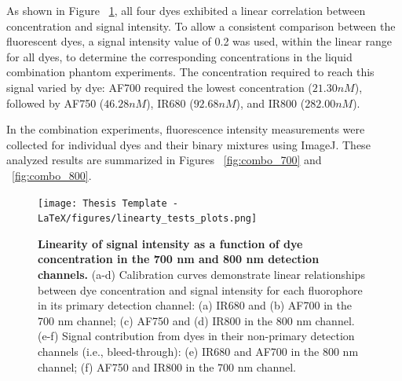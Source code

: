 As shown in Figure ~\ref{fig:linearity_test_plots}, all four dyes exhibited a linear correlation between concentration and signal intensity. To allow a consistent comparison between the fluorescent dyes, a signal intensity value of 0.2 was used, within the linear range for all dyes, to determine the
corresponding concentrations in the liquid combination phantom experiments. The concentration required to reach this signal varied by dye: AF700 required the lowest concentration ($21.30 nM$), followed by AF750 ($46.28 nM$), IR680 ($92.68 nM$), and IR800 ($282.00 nM$).

In the combination experiments, fluorescence intensity measurements were collected for individual dyes and their binary mixtures using ImageJ. These analyzed results are summarized in Figures ~\ref{fig:combo_700} and ~\ref{fig:combo_800}.

\begin{figure}[H]
    \centering
    \begin{minipage}{.94\linewidth}
        \texttt{[image: Thesis Template - LaTeX/figures/linearty\_tests\_plots.png]}
        \begin{minipage}{0pt}
            \label{fig:linearity_test_plots_a}
            \label{fig:linearity_test_plots_b}
            \label{fig:linearity_test_plots_c}
            \label{fig:linearity_test_plots_d}
            \label{fig:linearity_test_plots_e}
            \label{fig:linearity_test_plots_f}
        \end{minipage}
        \captionsetup{justification=raggedright, singlelinecheck=false}
        \caption[Linearity test results]{
            \textbf{Linearity of signal intensity as a function of dye concentration in the 700 nm and 800 nm detection channels.}
            (a-d) Calibration curves demonstrate linear relationships between dye concentration and signal intensity for each 
            fluorophore in its primary detection channel: (a) IR680 and (b) AF700 in the 700 nm channel; (c) AF750 and (d) IR800 in 
            the 800 nm channel. (e-f) Signal contribution from dyes in their non-primary detection channels (i.e., bleed-through): 
            (e) IR680 and AF700 in the 800 nm channel; (f) AF750 and IR800 in the 700 nm channel.  
            }
        \label{fig:linearity_test_plots}
    \end{minipage}
\end{figure}

